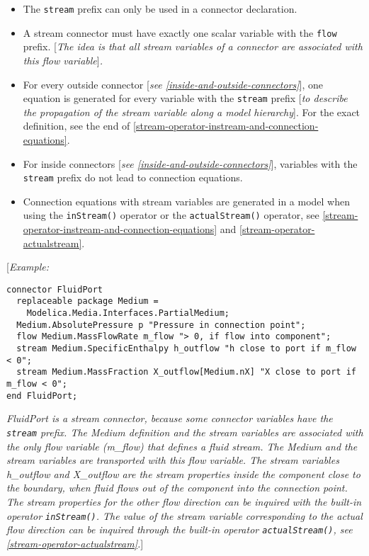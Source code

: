 \begin{itemize}
\item
  The \lstinline!stream! prefix can only be used in a connector
  declaration.
\item
  A stream connector must have exactly one scalar variable with the
  \lstinline!flow! prefix. {[}\emph{The idea is that all stream variables
  of a connector are associated with this flow variable}{]}\emph{.}
\item
  For every outside connector {[}\emph{see \autoref{inside-and-outside-connectors}}{]}, one
  equation is generated for every variable with the \lstinline!stream!
  prefix {[}\emph{to describe the propagation of the stream variable
  along a model hierarchy}{]}. For the exact definition, see the end of
  \autoref{stream-operator-instream-and-connection-equations}.
\item
  For inside connectors {[}\emph{see \autoref{inside-and-outside-connectors}}{]}, variables
  with the \lstinline!stream! prefix do not lead to connection equations.
\item
  Connection equations with stream variables are generated in a model
  when using the \lstinline!inStream()! operator or the
  \lstinline!actualStream()! operator, see \autoref{stream-operator-instream-and-connection-equations}
  and \autoref{stream-operator-actualstream}.
\end{itemize}

{[}\emph{Example:}

\begin{lstlisting}[language=modelica]
connector FluidPort
  replaceable package Medium =
    Modelica.Media.Interfaces.PartialMedium;
  Medium.AbsolutePressure p "Pressure in connection point";
  flow Medium.MassFlowRate m_flow "> 0, if flow into component";
  stream Medium.SpecificEnthalpy h_outflow "h close to port if m_flow < 0";
  stream Medium.MassFraction X_outflow[Medium.nX] "X close to port if m_flow < 0";
end FluidPort;
\end{lstlisting}
\emph{FluidPort is a stream connector, because some connector variables
have the \lstinline!stream! prefix. The Medium definition and the stream
variables are associated with the only flow variable (m\_flow) that
defines a fluid stream. The Medium and the stream variables are
transported with this flow variable. The stream variables h\_outflow and
X\_outflow are the stream properties inside the component close to the
boundary, when fluid flows out of the component into the connection
point. The stream properties for the other flow direction can be
inquired with the built-in operator \lstinline!inStream()!. The value of
the stream variable corresponding to the actual flow direction can be
inquired through the built-in operator \lstinline!actualStream()!, see
\autoref{stream-operator-actualstream}.}{]}

